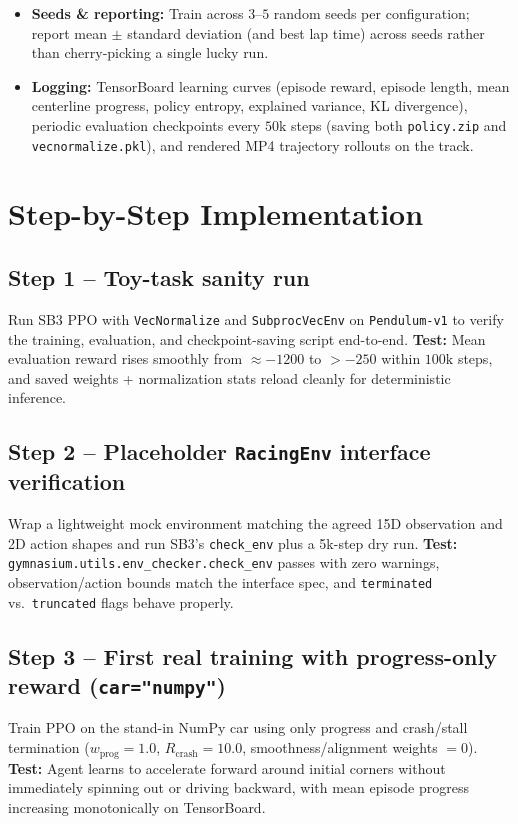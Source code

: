 \documentclass[11pt]{article}
\begin{document}
\begin{itemize}[leftmargin=1.5em, itemsep=0.25em]
    \item \textbf{Seeds \& reporting:} Train across $3\text{--}5$ random seeds per configuration; report mean $\pm$ standard deviation (and best lap time) across seeds rather than cherry-picking a single lucky run.
    \item \textbf{Logging:} TensorBoard learning curves (episode reward, episode length, mean centerline progress, policy entropy, explained variance, KL divergence), periodic evaluation checkpoints every $50\text{k}$ steps (saving both \texttt{policy.zip} and \texttt{vecnormalize.pkl}), and rendered MP4 trajectory rollouts on the track.
\end{itemize}

\section{Step-by-Step Implementation}

\subsection*{Step 1 -- Toy-task sanity run}
Run SB3 PPO with \texttt{VecNormalize} and \texttt{SubprocVecEnv} on \texttt{Pendulum-v1} to verify the training, evaluation, and checkpoint-saving script end-to-end.
\textbf{Test:} Mean evaluation reward rises smoothly from $\approx -1200$ to $> -250$ within $100\text{k}$ steps, and saved weights + normalization stats reload cleanly for deterministic inference.

\subsection*{Step 2 -- Placeholder \texttt{RacingEnv} interface verification}
Wrap a lightweight mock environment matching the agreed 15D observation and 2D action shapes and run SB3's \texttt{check\_env} plus a 5k-step dry run.
\textbf{Test:} \texttt{gymnasium.utils.env\_checker.check\_env} passes with zero warnings, observation/action bounds match the interface spec, and \texttt{terminated} vs.\ \texttt{truncated} flags behave properly.

\subsection*{Step 3 -- First real training with progress-only reward (\texttt{car="numpy"})}
Train PPO on the stand-in NumPy car using only progress and crash/stall termination ($w_{\text{prog}} = 1.0$, $R_{\text{crash}} = 10.0$, smoothness/alignment weights $= 0$).
\textbf{Test:} Agent learns to accelerate forward around initial corners without immediately spinning out or driving backward, with mean episode progress increasing monotonically on TensorBoard.
\end{document}
